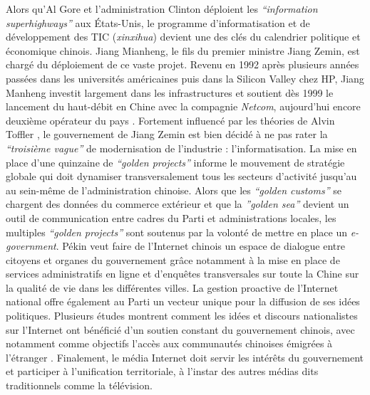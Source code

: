 Alors qu’Al Gore et l’administration Clinton déploient les \textit{“information superhighways”} aux États-Unis, le programme d’informatisation et de développement des TIC (\textit{xinxihua}) devient une des clés du calendrier politique et économique chinois. Jiang Mianheng, le fils du premier ministre Jiang Zemin, est chargé du déploiement de ce vaste projet. Revenu en 1992 après plusieurs années passées dans les universités américaines puis dans la Silicon Valley chez HP, Jiang Manheng investit largement dans les infrastructures et soutient dès 1999 le lancement du haut-débit en Chine avec la compagnie \textit{Netcom}, aujourd’hui encore deuxième opérateur du pays \citep{Dai2007}. Fortement influencé par les théories de Alvin Toffler \citep{Tsui2007}, le gouvernement de Jiang Zemin est bien décidé à ne pas rater la \textit{“troisième vague”} de modernisation de l’industrie : l’informatisation. La mise en place d’une quinzaine de \textit{“golden projects”} informe le mouvement de stratégie globale qui doit dynamiser transversalement tous les secteurs d’activité jusqu’au au sein-même de l’administration chinoise. Alors que les \textit{“golden customs”} se chargent des données du commerce extérieur et que la \textit{”golden sea”} devient un outil de communication entre cadres du Parti et administrations locales, les multiples \textit{“golden projects”} sont soutenus par la volonté de mettre en place un \textit{e-government}. Pékin veut faire de l’Internet chinois un espace de dialogue entre citoyens et organes du gouvernement grâce notamment à la mise en place de services administratifs en ligne et d’enquêtes transversales sur toute la Chine sur la qualité de vie dans les différentes villes. La gestion proactive de l’Internet national offre également au Parti un vecteur unique pour la diffusion de ses idées politiques. Plusieurs études montrent comment les idées et discours nationalistes sur l’Internet ont bénéficié d’un soutien constant du gouvernement chinois, avec notamment comme objectifs l’accès aux communautés chinoises émigrées à l’étranger \citep{Hughes2000}. Finalement, le média Internet doit servir les intérêts du gouvernement et participer à l’unification territoriale, à l’instar des autres médias dits traditionnels comme la télévision.

